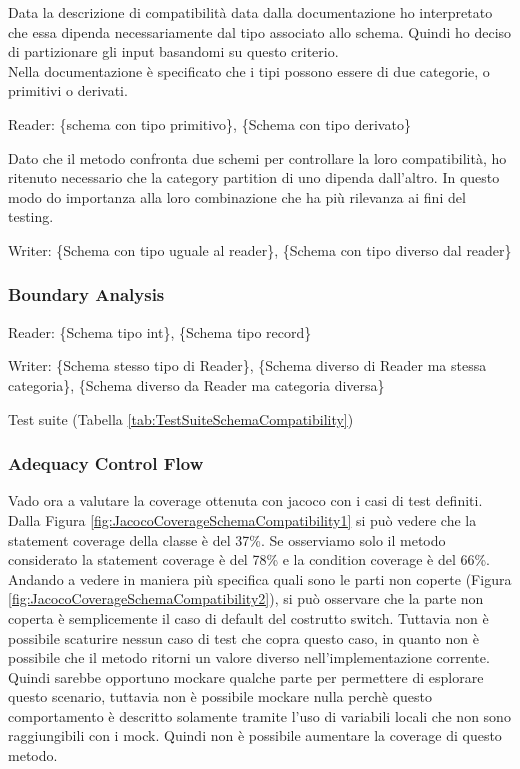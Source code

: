 \documentclass[12pt, a4paper]{article}
\begin{document}
Data la descrizione di compatibilità data dalla documentazione ho interpretato che essa dipenda necessariamente dal tipo 
associato allo schema. Quindi ho deciso di partizionare gli input basandomi su questo criterio. \\

Nella documentazione è specificato che i tipi possono essere di due categorie, o primitivi o derivati.

Reader: \{schema con tipo primitivo\}, \{Schema con tipo derivato\}

Dato che il metodo confronta due schemi per controllare la loro compatibilità, ho ritenuto necessario che la category partition
di uno dipenda dall'altro. In questo modo do importanza alla loro combinazione che ha più rilevanza ai fini del testing.

Writer: \{Schema con tipo uguale al reader\}, \{Schema con tipo diverso dal reader\}


\subsubsection{Boundary Analysis}

Reader: \{Schema tipo int\}, \{Schema tipo record\}

Writer: \{Schema stesso tipo di Reader\}, \{Schema diverso di Reader ma stessa categoria\}, \{Schema diverso da Reader ma categoria diversa\}
  
Test suite (Tabella \ref{tab:TestSuiteSchemaCompatibility})

\subsubsection{Adequacy Control Flow}
Vado ora a valutare la coverage ottenuta con jacoco con i casi di test definiti.
Dalla Figura \ref{fig:JacocoCoverageSchemaCompatibility1} si può vedere che la statement coverage della classe è del 37\%.
Se osserviamo solo il metodo considerato la statement coverage è del 78\% e la condition coverage è del 66\%.
Andando a vedere in maniera più specifica quali sono le parti non coperte (Figura \ref{fig:JacocoCoverageSchemaCompatibility2}),
si può osservare che la parte non coperta è semplicemente il caso di default del costrutto switch.
Tuttavia non è possibile scaturire nessun caso di test che copra questo caso, in quanto non è possibile che il metodo
ritorni un valore diverso nell'implementazione corrente. Quindi sarebbe opportuno mockare qualche parte per permettere
di esplorare questo scenario, tuttavia non è possibile mockare nulla perchè questo comportamento è descritto solamente
tramite l'uso di variabili locali che non sono raggiungibili con i mock. Quindi non è possibile aumentare la coverage
di questo metodo. \\
\end{document}
